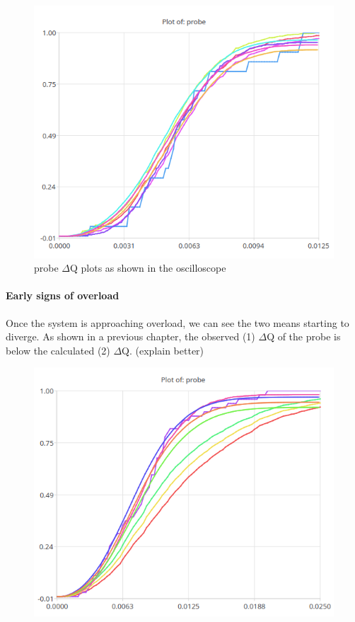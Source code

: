     \begin{figure}[H]
        \begin{center}
            \includegraphics[scale=0.6]{img/superp22.png}
        \end{center}
        \caption{probe $\Delta$Q plots as shown in the oscilloscope}
    \end{figure}

    \paragraph{Early signs of overload}
    
    Once the system is approaching overload, we can see the two means starting to diverge. As shown in a previous chapter, the observed (1) $\Delta$Q of the probe is below the calculated (2) $\Delta$Q. (explain better) 
    \begin{figure}[H]
        \begin{center}
            \includegraphics[scale=0.6]{img/diverging11.png}
        \end{center}
    \end{figure}
